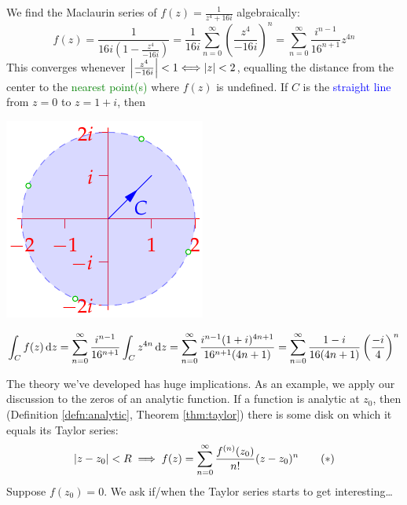 \begin{examples}{}{}
\begin{enumerate}
	  \begin{minipage}[t]{0.7\linewidth}\vspace{0pt}
		  \item We find the Maclaurin series of $f(z)=\frac 1{z^4+16i}$ algebraically:
		  \[
		  	f(z)=\frac 1{16i\left(1-\frac{z^4}{-16i}\right)} 
		  	=\frac 1{16i}\sum_{n=0}^\infty\left(\frac{z^4}{-16i}\right)^n 
		  	=\sum_{n=0}^\infty\frac{i^{n-1}}{16^{n+1}}z^{4n}
		  \]
		  This converges whenever $\left| \frac{z^4}{-16i}\right|<1\Longleftrightarrow \left| z\right|<2$, equalling the distance from the center to the \textcolor{Green}{nearest point(s)} where $f(z)$ is undefined. If $C$ is the \textcolor{blue}{straight line} from $z=0$ to $z=1+i$, then
	  \end{minipage}
	  \hfill
	  \begin{minipage}[t]{0.29\linewidth}\vspace{0pt}
	  	\flushright\includegraphics[scale=.95]{taylorex3}
	  \end{minipage}\par  
	  \[
	  	\int_Cf(z)\,{\mathrm{d} z}
	  	=\sum_{n=0}^\infty\frac{i^{n-1}}{16^{n+1}}\int_Cz^{4n}\,{\mathrm{d} z} 
	  	=\sum_{n=0}^\infty\frac{i^{n-1}(1+i)^{4n+1}}{16^{n+1}(4n+1)} 
	  	=\sum_{n=0}^\infty\frac{1-i}{16(4n+1)}\left(\frac{-i}{4}\right)^n
	  \] 
	\end{enumerate}
\end{examples}


\goodbreak



The theory we've developed has huge implications. As an example, we apply our discussion to the zeros of an analytic function. If a function is analytic at $z_0$, then (Definition \ref{defn:analytic}, Theorem \ref{thm:taylor}) there is some disk on which it equals its Taylor series: 
\[
	\left| z-z_0\right|<R\implies f(z)=\sum_{n=0}^\infty \frac{f^{(n)}(z_0)}{n!}(z-z_0)^n \tag{$\ast$}
\]
Suppose $f(z_0)=0$. We ask if/when the Taylor series starts to get interesting\ldots


